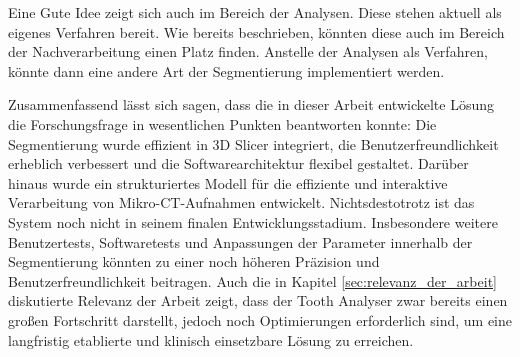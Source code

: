 Eine Gute Idee zeigt sich auch im Bereich der Analysen. Diese stehen aktuell als
eigenes Verfahren bereit. Wie bereits beschrieben, könnten diese auch im Bereich
der Nachverarbeitung einen Platz finden. Anstelle der Analysen als Verfahren, könnte
dann eine andere Art der Segmentierung implementiert werden.

Zusammenfassend lässt sich sagen, dass die in dieser Arbeit entwickelte Lösung
die Forschungsfrage in wesentlichen Punkten beantworten konnte: Die Segmentierung
wurde effizient in 3D Slicer integriert, die Benutzerfreundlichkeit erheblich
verbessert und die Softwarearchitektur flexibel gestaltet. Darüber hinaus wurde ein
strukturiertes Modell für die effiziente und interaktive Verarbeitung von Mikro-\ac{CT}-Aufnahmen
entwickelt. Nichtsdestotrotz ist das System noch nicht in seinem finalen Entwicklungsstadium.
Insbesondere weitere Benutzertests, Softwaretests und Anpassungen der Parameter innerhalb
der Segmentierung könnten zu einer noch höheren Präzision und Benutzerfreundlichkeit
beitragen. Auch die in Kapitel \ref{sec:relevanz_der_arbeit} diskutierte
Relevanz der Arbeit zeigt, dass der Tooth Analyser zwar bereits einen großen Fortschritt
darstellt, jedoch noch Optimierungen erforderlich sind, um eine langfristig etablierte
und klinisch einsetzbare Lösung zu erreichen.
